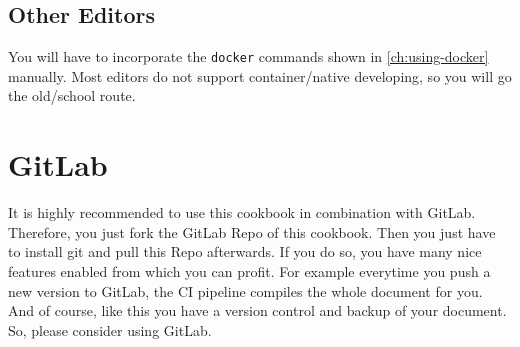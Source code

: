 \subsection{Other Editors}

You will have to incorporate the \texttt{docker} commands shown in \cref{ch:using-docker} manually.
Most editors do not support container\-/native developing, so you will go the old\-/school route.

\section{GitLab}
\label{ch:GitLab}

It is highly recommended to use this cookbook in combination with GitLab. Therefore,
you just fork the GitLab Repo of this cookbook. Then you just have to install git
and pull this Repo afterwards. If you do so, you have many nice features enabled
from which you can profit. For example everytime you push a new version to GitLab,
the CI pipeline compiles the whole document for you.
And of course, like this you have a version control and backup of your document.
So, please consider using GitLab.
